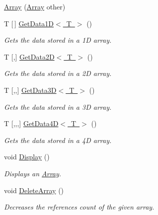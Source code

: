 \begin{DoxyCompactItemize}
\item 
\mbox{\hyperlink{classkhiva_1_1array_1_1_array_ab754cc1534896f8451d717aa3f09901d}{Array}} (\mbox{\hyperlink{classkhiva_1_1array_1_1_array}{Array}} other)
\item 
T \mbox{[}$\,$\mbox{]} \mbox{\hyperlink{classkhiva_1_1array_1_1_array_a7df0163f57f98043ec898c9378a8c1c4}{Get\+Data1\+D$<$ T $>$}} ()
\begin{DoxyCompactList}\small\item\em Gets the data stored in a 1D array. \end{DoxyCompactList}\item 
T \mbox{[},\mbox{]} \mbox{\hyperlink{classkhiva_1_1array_1_1_array_a456b5971538b718b30eb088c05e02326}{Get\+Data2\+D$<$ T $>$}} ()
\begin{DoxyCompactList}\small\item\em Gets the data stored in a 2D array. \end{DoxyCompactList}\item 
T \mbox{[},,\mbox{]} \mbox{\hyperlink{classkhiva_1_1array_1_1_array_a3996ff16f532b05862169501f3afeda1}{Get\+Data3\+D$<$ T $>$}} ()
\begin{DoxyCompactList}\small\item\em Gets the data stored in a 3D array. \end{DoxyCompactList}\item 
T \mbox{[},,,\mbox{]} \mbox{\hyperlink{classkhiva_1_1array_1_1_array_a2ce7b4495a9be089d5747530b83eccbd}{Get\+Data4\+D$<$ T $>$}} ()
\begin{DoxyCompactList}\small\item\em Gets the data stored in a 4D array. \end{DoxyCompactList}\item 
void \mbox{\hyperlink{classkhiva_1_1array_1_1_array_adf556e2b36f77d285c92c1fbae9f59bb}{Display}} ()
\begin{DoxyCompactList}\small\item\em Displays an \mbox{\hyperlink{classkhiva_1_1array_1_1_array}{Array}}. \end{DoxyCompactList}\item 
void \mbox{\hyperlink{classkhiva_1_1array_1_1_array_abb95e64e8c3514136fe8a5fb2a0e929d}{Delete\+Array}} ()
\begin{DoxyCompactList}\small\item\em Decreases the references count of the given array. \end{DoxyCompactList}\item 

\end{DoxyCompactItemize}
